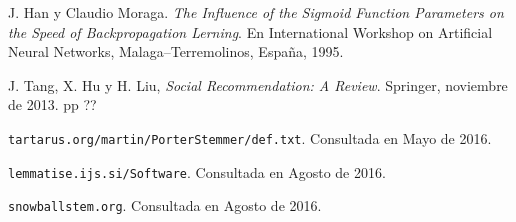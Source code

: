 \documentclass[11pt, spanish]{report}
\begin{document}
\begin{thebibliography}{56}
  			J. Han y Claudio Moraga. 
  			\textit{The Influence of the Sigmoid Function Parameters on the Speed of Backpropagation Lerning}. 
  			En International Workshop on Artificial Neural Networks, Malaga--Terremolinos, España, 1995.
  		
  			J. Tang, X. Hu y H. Liu, 
  			\textit{Social Recommendation: A Review}. 
  			Springer, 
  			noviembre de 2013. 
  			pp ??
  		
  			\texttt{tartarus.org/martin/PorterStemmer/def.txt}.
  			Consultada en Mayo de 2016.
  			
  			\texttt{lemmatise.ijs.si/Software}.
  			Consultada en Agosto de 2016.
  	
  			\texttt{snowballstem.org}.
  			Consultada en Agosto de 2016.
  			
  			
	\end{thebibliography}
		
	\appendix
\end{document}
